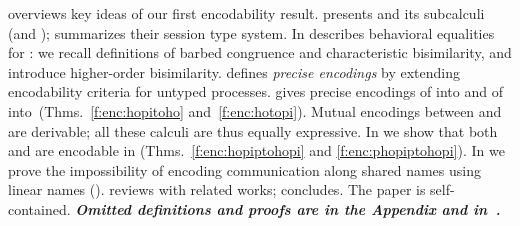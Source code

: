  overviews key ideas of our first encodability result.
{} presents \HOp and its 
subcalculi (\HO and \sessp); %
 summarizes their session type system.
In  describes behavioral equalities for \HOp:
we recall definitions of barbed congruence and characteristic bisimilarity, 
and introduce higher-order bisimilarity.
 defines \emph{precise %
encodings} by extending encodability criteria  for untyped processes. %
{} %
gives {precise encodings} of \HOp into \HO and of \HOp into~\sessp (Thms.~\ref{f:enc:hopitoho} and~\ref{f:enc:hotopi}).
Mutual encodings between \sessp and \HO are derivable; 
all these calculi are thus equally expressive.
In  %
we show that both \HOpp 
and \PHOp 
are encodable in \HOp
(Thms.~\ref{f:enc:hopiptohopi} and \ref{f:enc:phopiptohopi}).
In  we prove the impossibility of encoding communication along shared names
using linear names ().
{} reviews with related works;
 concludes.
The paper is self-contained. 
{\bf\em Omitted definitions and  proofs 
are in the Appendix and in~\cite{KouzapasPY15}.} 


